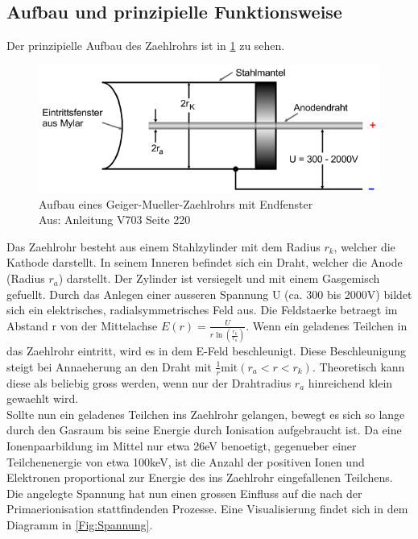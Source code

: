 \documentclass[titlepage=firstcover, captions=tableheading]{scrartcl}
\begin{document}
\subsection{Aufbau und prinzipielle Funktionsweise}
Der prinzipielle Aufbau des Zaehlrohrs ist in \ref{Fig:Aufbau} zu sehen.
\begin{figure}[H]
    \centering
    \includegraphics{"Aufbau_Geiger.png"}
    \caption{Aufbau eines Geiger-Mueller-Zaehlrohrs mit Endfenster\\ Aus: Anleitung V703 Seite 220}
    \label{Fig:Aufbau}
\end{figure}
 \noindent Das Zaehlrohr besteht aus einem Stahlzylinder mit dem Radius $r_k$, welcher die Kathode darstellt. In seinem Inneren befindet sich ein Draht, welcher die Anode (Radius $r_a$) darstellt. Der Zylinder ist versiegelt und mit einem Gasgemisch gefuellt. Durch das Anlegen einer ausseren Spannung U (ca. 300 bis 2000V) bildet sich ein elektrisches, radialsymmetrisches Feld aus. Die Feldstaerke betraegt im Abstand r von der Mittelachse $E(r)=\frac{U}{r\ln(\frac{r_k}{r_a})}$.
 Wenn ein geladenes Teilchen in das Zaehlrohr eintritt, wird es in dem E-Feld beschleunigt. Diese Beschleunigung steigt bei Annaeherung an den Draht mit $\frac{1}{r} \text{mit} (r_a < r < r_k)$. Theoretisch kann diese als beliebig gross werden, wenn nur der Drahtradius $r_a$ hinreichend klein gewaehlt wird.\\
 Sollte nun ein geladenes Teilchen ins Zaehlrohr gelangen, bewegt es sich so lange durch den Gasraum bis seine Energie durch Ionisation aufgebraucht ist. Da eine Ionenpaarbildung im Mittel nur etwa 26eV benoetigt, gegenueber einer Teilchenenergie von etwa 100keV, ist die Anzahl der positiven Ionen und Elektronen proportional zur Energie des ins Zaehlrohr eingefallenen Teilchens. Die angelegte Spannung hat nun einen grossen Einfluss auf die nach der Primaerionisation stattfindenden Prozesse. Eine Visualisierung findet sich in dem Diagramm in \ref{Fig:Spannung}.
\end{document}
